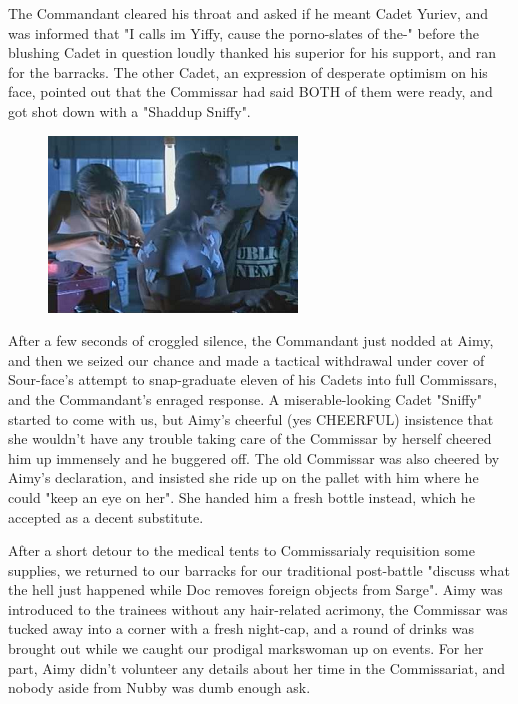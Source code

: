 The Commandant cleared his throat and asked if he meant Cadet Yuriev, and was informed that "I calls im Yiffy, cause the porno-slates of the-" before the blushing Cadet in question loudly thanked his superior for his support, and ran for the barracks. 
The other Cadet, an expression of desperate optimism on his face, pointed out that the Commissar had said BOTH of them were ready, and got shot down with a "Shaddup Sniffy".

\begin{figure}
	\begin{center}
		\includegraphics[width=\figwidth]{pics/21/59.png}
	\end{center}
\end{figure}
After a few seconds of croggled silence, the Commandant just nodded at Aimy, and then we seized our chance and made a tactical withdrawal under cover of Sour-face's attempt to snap-graduate eleven of his Cadets into full Commissars, and the Commandant's enraged response. 
A miserable-looking Cadet "Sniffy" started to come with us, but Aimy's cheerful (yes CHEERFUL) insistence that she wouldn't have any trouble taking care of the Commissar by herself cheered him up immensely and he buggered off. 
The old Commissar was also cheered by Aimy's declaration, and insisted she ride up on the pallet with him where he could "keep an eye on her". 
She handed him a fresh bottle instead, which he accepted as a decent substitute.

After a short detour to the medical tents to Commissarialy requisition some supplies, we returned to our barracks for our traditional post-battle "discuss what the hell just happened while Doc removes foreign objects from Sarge". 
Aimy was introduced to the trainees without any hair-related acrimony, the Commissar was tucked away into a corner with a fresh night-cap, and a round of drinks was brought out while we caught our prodigal markswoman up on events. 
For her part, Aimy didn't volunteer any details about her time in the Commissariat, and nobody aside from Nubby was dumb enough ask. 


